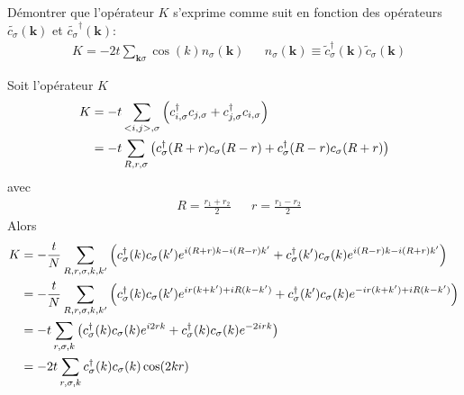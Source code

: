\documentclass{subfiles}[../main.tex]
\begin{document}
            \begin{problem}
                Démontrer que l'opérateur $K$ s'exprime
                comme suit en fonction des opérateurs
                $\widetilde{c_\sigma}(\bm{k})$ et
                $\widetilde{c_\sigma}^\dagger(\bm{k})$:
                \begin{align}
                    &K=-2t\sum_{\bm{k}\sigma}
                    \cos(k)n_\sigma(\bm{k})
                    &&n_\sigma(\bm{k})\equiv
                    \widetilde{c}_\sigma^\dagger(\bm{k})
                    \widetilde{c}_\sigma(\bm{k})
                \end{align}
            \end{problem}
            Soit l'opérateur $K$
            \begin{align}
                K&=-t\sum_{<i,j>,\sigma}\qty(c^\dagger_{i,\sigma}c_{j,\sigma}
                +c^\dagger_{j,\sigma}c_{i,\sigma})\\
                &=-t\sum_{R,r,\sigma}\qty(c^\dagger_{\sigma}(R+r)c_{\sigma}(R-r)
                +c^\dagger_{\sigma}(R-r)c_{\sigma}(R+r))
            \end{align}
            avec
            \begin{align}
                &R=\frac{r_1+r_2}{2}
                &&r=\frac{r_1-r_2}{2}
            \end{align}
            Alors
            \begin{align}
                K&=-\frac{t}{N}\sum_{R,r,\sigma,k,k'}\qty(
                    c^\dagger_{\sigma}(k)c_\sigma(k')e^{i(R+r)k-i(R-r)k'}+
                    c^\dagger_{\sigma}(k')c_\sigma(k)e^{i(R-r)k-i(R+r)k'}
                )\\
                &=-\frac{t}{N}\sum_{R,r,\sigma,k,k'}\qty(
                    c^\dagger_{\sigma}(k)c_\sigma(k')e^{ir(k+k')+iR(k-k')}+
                    c^\dagger_{\sigma}(k')c_\sigma(k)e^{-ir(k+k')+iR(k-k')}
                )\\
                &=-t\sum_{r,\sigma,k}\qty(
                    c^\dagger_{\sigma}(k)c_\sigma(k)e^{i2rk}+
                    c^\dagger_{\sigma}(k)c_\sigma(k)e^{-2irk}
                )\\
                &=-2t\sum_{r,\sigma,k}
                    c^\dagger_{\sigma}(k)c_\sigma(k)\cos(2kr)
            \end{align}
\end{document}
